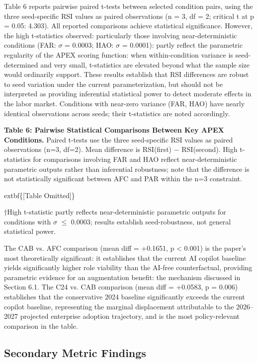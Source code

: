 \documentclass[10pt, conference]{IEEEtran}
\begin{document}
\label{sec:statistical_comparisons}

Table 6 reports pairwise paired t-tests between selected condition pairs, using the three seed-specific RSI values as paired observations (n = 3, df = 2; critical t at p = 0.05: 4.303). All reported comparisons achieve statistical significance. However, the high t-statistics observed: particularly those involving near-deterministic conditions (FAR: $\sigma$ = 0.0003; HAO: $\sigma$ = 0.0001): partly reflect the parametric regularity of the APEX scoring function: when within-condition variance is seed-determined and very small, t-statistics are elevated beyond what the sample size would ordinarily support. These results establish that RSI differences are robust to seed variation under the current parameterization, but should not be interpreted as providing inferential statistical power to detect moderate effects in the labor market. Conditions with near-zero variance (FAR, HAO) have nearly identical observations across seeds; their t-statistics are noted accordingly.

\textbf{Table 6: Pairwise Statistical Comparisons Between Key APEX Conditions.} Paired t-tests use the three seed-specific RSI values as paired observations (n=3, df=2). Mean difference is RSI(first) $-$ RSI(second). High t-statistics for comparisons involving FAR and HAO reflect near-deterministic parametric outputs rather than inferential robustness; note that the difference is not statistically significant between AFC and PAR within the n=3 constraint.

	extbf\{[Table Omitted]\}

†High t-statistic partly reflects near-deterministic parametric outputs for conditions with $\sigma$ $\leq$ 0.0003; results establish seed-robustness, not general statistical power.

The CAB vs. AFC comparison (mean diff = +0.1651, p < 0.001) is the paper's most theoretically significant: it establishes that the current AI copilot baseline yields significantly higher role viability than the AI-free counterfactual, providing parametric evidence for an augmentation benefit: the mechanism discussed in Section 6.1. The C24 vs. CAB comparison (mean diff = +0.0583, p = 0.006) establishes that the conservative 2024 baseline significantly exceeds the current copilot baseline, representing the marginal displacement attributable to the 2026--2027 projected enterprise adoption trajectory, and is the most policy-relevant comparison in the table.

\subsection{Secondary Metric Findings}
\end{document}

